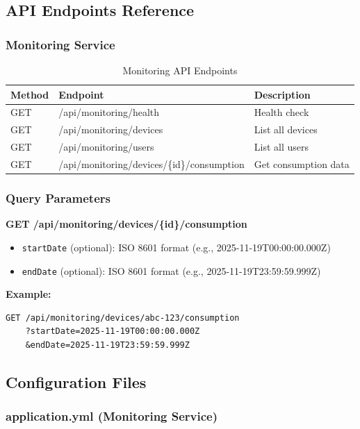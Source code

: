 \documentclass[12pt,a4paper]{article}
\begin{document}
\subsection{API Endpoints Reference}

\subsubsection{Monitoring Service}

\begin{table}[h]
\centering
\small
\begin{tabular}{|l|l|p{6cm}|}
\hline
\textbf{Method} & \textbf{Endpoint} & \textbf{Description} \\
\hline
GET & /api/monitoring/health & Health check \\
GET & /api/monitoring/devices & List all devices \\
GET & /api/monitoring/users & List all users \\
GET & /api/monitoring/devices/\{id\}/consumption & Get consumption data \\
\hline
\end{tabular}
\caption{Monitoring API Endpoints}
\end{table}

\subsubsection{Query Parameters}

\textbf{GET /api/monitoring/devices/\{id\}/consumption}

\begin{itemize}
    \item \texttt{startDate} (optional): ISO 8601 format (e.g., 2025-11-19T00:00:00.000Z)
    \item \texttt{endDate} (optional): ISO 8601 format (e.g., 2025-11-19T23:59:59.999Z)
\end{itemize}

\textbf{Example:}
\begin{verbatim}
GET /api/monitoring/devices/abc-123/consumption
    ?startDate=2025-11-19T00:00:00.000Z
    &endDate=2025-11-19T23:59:59.999Z
\end{verbatim}

\subsection{Configuration Files}

\subsubsection{application.yml (Monitoring Service)}
\end{document}
